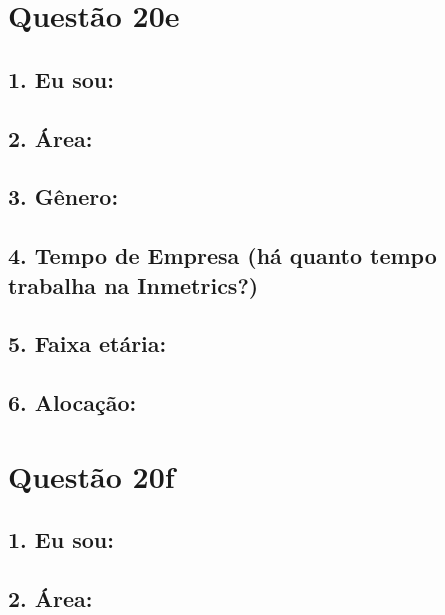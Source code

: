\documentclass[]{book}
\begin{document}
\hypertarget{questao-20e}{%
\section{Questão 20e}\label{questao-20e}}

\hypertarget{eu-sou-57}{%
\subsection{1. Eu sou:}\label{eu-sou-57}}

\hypertarget{area-57}{%
\subsection{2. Área:}\label{area-57}}

\hypertarget{genero-57}{%
\subsection{3. Gênero:}\label{genero-57}}

\hypertarget{tempo-de-empresa-ha-quanto-tempo-trabalha-na-inmetrics-57}{%
\subsection{4. Tempo de Empresa (há quanto tempo trabalha na Inmetrics?)}\label{tempo-de-empresa-ha-quanto-tempo-trabalha-na-inmetrics-57}}

\hypertarget{faixa-etaria-57}{%
\subsection{5. Faixa etária:}\label{faixa-etaria-57}}

\hypertarget{alocacao-57}{%
\subsection{6. Alocação:}\label{alocacao-57}}

\hypertarget{questao-20f}{%
\section{Questão 20f}\label{questao-20f}}

\hypertarget{eu-sou-58}{%
\subsection{1. Eu sou:}\label{eu-sou-58}}

\hypertarget{area-58}{%
\subsection{2. Área:}\label{area-58}}
\end{document}
